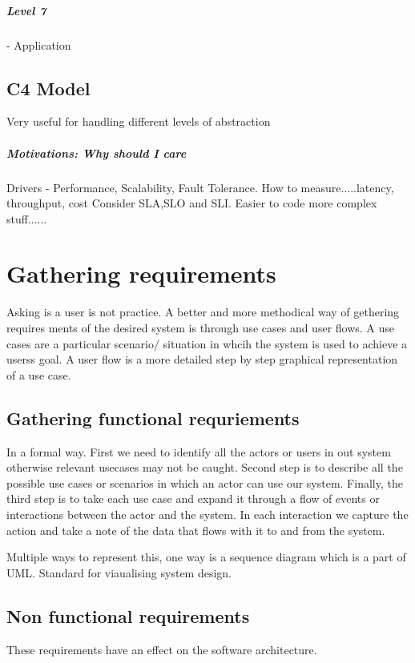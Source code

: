 \documentclass[a4paper, 11pt]{book}
\begin{document}
    \paragraph{Level 7} - Application


    \section{C4 Model}
    Very useful for handling different levels of abstraction

    \paragraph{Motivations: Why should I care}
    Drivers - Performance, Scalability, Fault Tolerance.
    How to measure.....latency, throughput, cost
    Consider SLA,SLO and SLI.
    Easier to code more complex stuff......


    \chapter{Gathering requirements}
    Asking is a user is not practice.
    A better and more methodical way of gethering requires ments of the desired system is through use cases and user flows.
    A use cases are a particular scenario/ situation in whcih the system is used to achieve a userss goal.
    A user flow is a more detailed step by step graphical representation of a use case.


    \section{Gathering functional requriements}
    In a formal way.
    First we need to identify all the actors or users in out system otherwise relevant usecases may not be caught.
    Second step is to describe all the possible use cases or scenarios in which an actor can use our system.
    Finally, the third step is to take each use case and expand it through a flow of events or interactions between the actor and the system.
    In each interaction we capture the action and take a note of the data that flows with it to and from the system.

    Multiple ways to represent this, one way is a sequence diagram which is a part of UML. Standard for viaualising system design.


    \section{Non functional requirements}
    These requirements have an effect on the software architecture.
\end{document}

